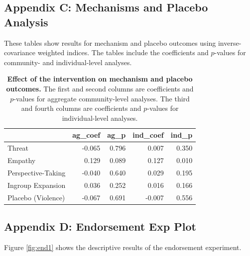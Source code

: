 \documentclass[11pt]{article}
\begin{document}
\hypertarget{appendix-c-mechanisms-and-placebo-analysis}{%
\subsection{Appendix C: Mechanisms and Placebo
Analysis}\label{appendix-c-mechanisms-and-placebo-analysis}}

These tables show results for mechanism and placebo outcomes using
inverse-covariance weighted indices. The tables include the coefficients
and \(p\)-values for community- and individual-level analyses.

\begin{table}[H]
\begin{center}

\begin{tabular}{l|r|r|r|r}
\hline
  & ag\_coef & ag\_p & ind\_coef & ind\_p\\
\hline
Threat & -0.065 & 0.796 & 0.007 & 0.350\\
\hline
Empathy & 0.129 & 0.089 & 0.127 & 0.010\\
\hline
Perspective-Taking & -0.040 & 0.640 & 0.029 & 0.195\\
\hline
Ingroup Expansion & 0.036 & 0.252 & 0.016 & 0.166\\
\hline
Placebo (Violence) & -0.067 & 0.691 & -0.007 & 0.556\\
\hline
\end{tabular}


\caption{\label{tab:mech_ind_tab}\textbf{Effect of the intervention on mechanism and placebo outcomes.} The first and second columns are coefficients and $p$-values for aggregate community-level analyses.  The third and fourth columns are coefficients and $p$-values for individual-level analyses.}
\end{center}
\end{table}

\hypertarget{appendix-d-endorsement-exp-plot}{%
\subsection{Appendix D: Endorsement Exp
Plot}\label{appendix-d-endorsement-exp-plot}}

Figure \ref{fig:end1} shows the descriptive results of the endorsement
experiment.
\end{document}

